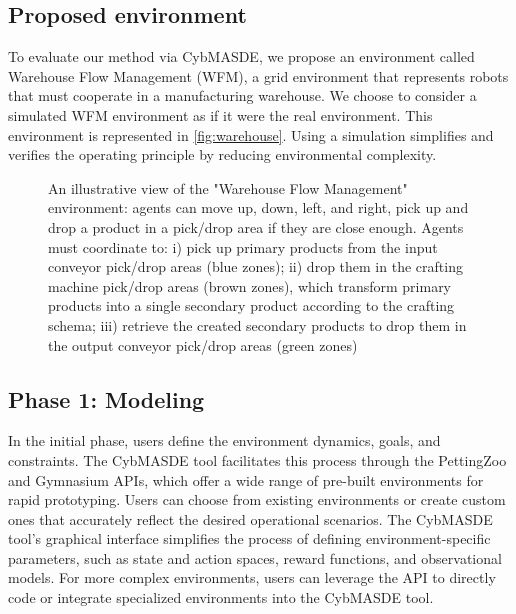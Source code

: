 \documentclass[conference]{IEEEtran}
\begin{document}
\subsection{Proposed environment}
To evaluate our method via CybMASDE, we propose an environment called Warehouse Flow Management (WFM), a grid environment that represents robots that must cooperate in a manufacturing warehouse. We choose to consider a simulated WFM environment as if it were the real environment. This environment is represented in \autoref{fig:warehouse}.
Using a simulation simplifies and verifies the operating principle by reducing environmental complexity.

\begin{figure}[h!]
  \centering
  
  \caption{An illustrative view of the "Warehouse Flow Management" environment: agents can move up, down, left, and right, pick up and drop a product in a pick/drop area if they are close enough. Agents must coordinate to: i) pick up primary products from the input conveyor pick/drop areas (blue zones); ii) drop them in the crafting machine pick/drop areas (brown zones), which transform primary products into a single secondary product according to the crafting schema; iii) retrieve the created secondary products to drop them in the output conveyor pick/drop areas (green zones)}
  \label{fig:warehouse}
\end{figure}

\subsection{Phase 1: Modeling}

In the initial phase, users define the environment dynamics, goals, and constraints. The CybMASDE tool facilitates this process through the PettingZoo and Gymnasium APIs, which offer a wide range of pre-built environments for rapid prototyping. Users can choose from existing environments or create custom ones that accurately reflect the desired operational scenarios. The CybMASDE tool's graphical interface simplifies the process of defining environment-specific parameters, such as state and action spaces, reward functions, and observational models. For more complex environments, users can leverage the API to directly code or integrate specialized environments into the CybMASDE tool.
\end{document}
